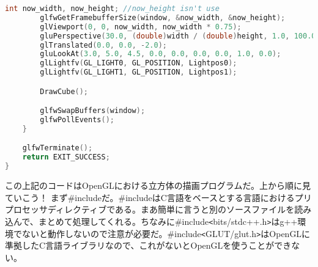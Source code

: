 \documentclass[12pt,a4paper]{jsarticle}
\begin{document}
\begin{lstlisting}[language=C++]
		int now_width, now_height; //now_height isn't use
		glfwGetFramebufferSize(window, &now_width, &now_height);
		glViewport(0, 0, now_width, now_width * 0.75);
		gluPerspective(30.0, (double)width / (double)height, 1.0, 100.0);
		glTranslated(0.0, 0.0, -2.0);
		gluLookAt(3.0, 5.0, 4.5, 0.0, 0.0, 0.0, 0.0, 1.0, 0.0);
		glLightfv(GL_LIGHT0, GL_POSITION, Lightpos0);
		glLightfv(GL_LIGHT1, GL_POSITION, Lightpos1);

		DrawCube();

		glfwSwapBuffers(window);
		glfwPollEvents();
	}

	glfwTerminate();
	return EXIT_SUCCESS;
}
\end{lstlisting}

この上記のコードはOpenGLにおける立方体の描画プログラムだ。上から順に見ていこう！
まず\#includeだ。\#includeはC言語をベースとする言語におけるプリプロセッサディレクティブである。まあ簡単に言うと別のソースファイルを読み込んで、まとめて処理してくれる。ちなみに\#include\verb|<|bits/stdc++.h\verb|>|はg++環境でないと動作しないので注意が必要だ。\#include\verb|<|GLUT/glut.h\verb|>|はOpenGLに準拠したC言語ライブラリなので、これがないとOpenGLを使うことができない。
\end{document}
